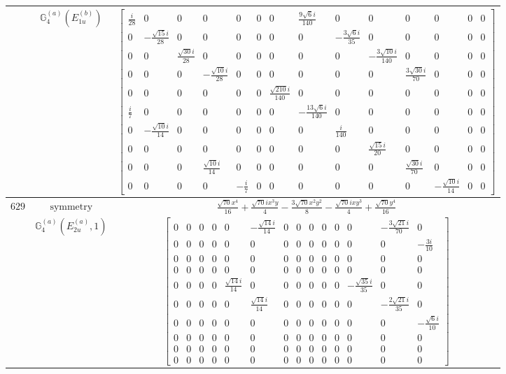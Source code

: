 \documentclass[fleqn,8pt,landscape]{jsarticle}
\begin{document}
\begin{longtable}{ccc}
$  $ & $ \mathbb{G}_{4}^{(a)}(E_{1u}^{(b)}) $ & $ \begin{bmatrix} \frac{i}{28} & 0 & 0 & 0 & 0 & 0 & 0 & \frac{9 \sqrt{6} i}{140} & 0 & 0 & 0 & 0 & 0 & 0 \\ 0 & - \frac{\sqrt{15} i}{28} & 0 & 0 & 0 & 0 & 0 & 0 & - \frac{3 \sqrt{6} i}{35} & 0 & 0 & 0 & 0 & 0 \\ 0 & 0 & \frac{\sqrt{30} i}{28} & 0 & 0 & 0 & 0 & 0 & 0 & - \frac{3 \sqrt{10} i}{140} & 0 & 0 & 0 & 0 \\ 0 & 0 & 0 & - \frac{\sqrt{10} i}{28} & 0 & 0 & 0 & 0 & 0 & 0 & \frac{3 \sqrt{30} i}{70} & 0 & 0 & 0 \\ 0 & 0 & 0 & 0 & 0 & 0 & \frac{\sqrt{210} i}{140} & 0 & 0 & 0 & 0 & 0 & 0 & 0 \\ \frac{i}{7} & 0 & 0 & 0 & 0 & 0 & 0 & - \frac{13 \sqrt{6} i}{140} & 0 & 0 & 0 & 0 & 0 & 0 \\ 0 & - \frac{\sqrt{10} i}{14} & 0 & 0 & 0 & 0 & 0 & 0 & \frac{i}{140} & 0 & 0 & 0 & 0 & 0 \\ 0 & 0 & 0 & 0 & 0 & 0 & 0 & 0 & 0 & \frac{\sqrt{15} i}{20} & 0 & 0 & 0 & 0 \\ 0 & 0 & 0 & \frac{\sqrt{10} i}{14} & 0 & 0 & 0 & 0 & 0 & 0 & \frac{\sqrt{30} i}{70} & 0 & 0 & 0 \\ 0 & 0 & 0 & 0 & - \frac{i}{7} & 0 & 0 & 0 & 0 & 0 & 0 & - \frac{\sqrt{10} i}{14} & 0 & 0 \end{bmatrix} $ \\ \hline
$ 629 $ & $ \text{symmetry} $ & $ \frac{\sqrt{70} x^{4}}{16} + \frac{\sqrt{70} i x^{3} y}{4} - \frac{3 \sqrt{70} x^{2} y^{2}}{8} - \frac{\sqrt{70} i x y^{3}}{4} + \frac{\sqrt{70} y^{4}}{16} $ \\
$  $ & $ \mathbb{G}_{4}^{(a)}(E_{2u}^{(a)},1) $ & $ \begin{bmatrix} 0 & 0 & 0 & 0 & 0 & - \frac{\sqrt{14} i}{14} & 0 & 0 & 0 & 0 & 0 & 0 & - \frac{3 \sqrt{21} i}{70} & 0 \\ 0 & 0 & 0 & 0 & 0 & 0 & 0 & 0 & 0 & 0 & 0 & 0 & 0 & - \frac{3 i}{10} \\ 0 & 0 & 0 & 0 & 0 & 0 & 0 & 0 & 0 & 0 & 0 & 0 & 0 & 0 \\ 0 & 0 & 0 & 0 & 0 & 0 & 0 & 0 & 0 & 0 & 0 & 0 & 0 & 0 \\ 0 & 0 & 0 & 0 & \frac{\sqrt{14} i}{14} & 0 & 0 & 0 & 0 & 0 & 0 & - \frac{\sqrt{35} i}{35} & 0 & 0 \\ 0 & 0 & 0 & 0 & 0 & \frac{\sqrt{14} i}{14} & 0 & 0 & 0 & 0 & 0 & 0 & - \frac{2 \sqrt{21} i}{35} & 0 \\ 0 & 0 & 0 & 0 & 0 & 0 & 0 & 0 & 0 & 0 & 0 & 0 & 0 & - \frac{\sqrt{6} i}{10} \\ 0 & 0 & 0 & 0 & 0 & 0 & 0 & 0 & 0 & 0 & 0 & 0 & 0 & 0 \\ 0 & 0 & 0 & 0 & 0 & 0 & 0 & 0 & 0 & 0 & 0 & 0 & 0 & 0 \\ 0 & 0 & 0 & 0 & 0 & 0 & 0 & 0 & 0 & 0 & 0 & 0 & 0 & 0 \end{bmatrix} $ \\ \hline

\end{longtable}
\end{document}
